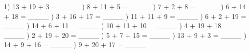 \documentclass{article}%
\begin{document}
1) 13 + 19 + 3 = \_\_\_\_%
\newline%
\newline%
) 8 + 11 + 5 = \_\_\_\_%
\newline%
\newline%
) 7 + 2 + 8 = \_\_\_\_%
\newline%
\newline%
) 6 + 14 + 18 = \_\_\_\_%
\newline%
\newline%
) 3 + 16 + 17 = \_\_\_\_%
\newline%
\newline%
) 11 + 11 + 9 = \_\_\_\_%
\newline%
\newline%
) 6 + 2 + 19 = \_\_\_\_%
\newline%
\newline%
) 14 + 6 + 11 = \_\_\_\_%
\newline%
\newline%
) 10 + 11 + 10 = \_\_\_\_%
\newline%
\newline%
) 4 + 19 + 18 = \_\_\_\_%
\newline%
\newline%
) 2 + 19 + 20 = \_\_\_\_%
\newline%
\newline%
) 5 + 7 + 15 = \_\_\_\_%
\newline%
\newline%
) 13 + 9 + 3 = \_\_\_\_%
\newline%
\newline%
) 14 + 9 + 16 = \_\_\_\_%
\newline%
\newline%
) 9 + 20 + 17 = \_\_\_\_%
\newline%
\newline%
\end{document}
